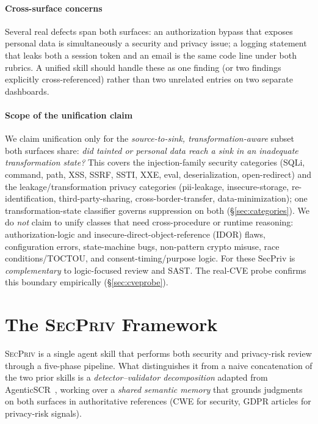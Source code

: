 \documentclass[runningheads]{llncs}
\begin{document}
\paragraph{Cross-surface concerns} Several real defects span both surfaces: an authorization bypass that exposes personal data is simultaneously a security and privacy issue; a logging statement that leaks both a session token and an email is the same code line under both rubrics. A unified skill should handle these as one finding (or two findings explicitly cross-referenced) rather than two unrelated entries on two separate dashboards.

\paragraph{Scope of the unification claim} We claim unification only for the \emph{source-to-sink, transformation-aware} subset both surfaces share: \emph{did tainted or personal data reach a sink in an inadequate transformation state?} This covers the injection-family security categories (SQLi, command, path, XSS, SSRF, SSTI, XXE, eval, deserialization, open-redirect) and the leakage/transformation privacy categories (pii-leakage, insecure-storage, re-identification, third-party-sharing, cross-border-transfer, data-minimization); one transformation-state classifier governs suppression on both (\S\ref{sec:categories}). We do \emph{not} claim to unify classes that need cross-procedure or runtime reasoning: authorization-logic and insecure-direct-object-reference (IDOR) flaws, configuration errors, state-machine bugs, non-pattern crypto misuse, race conditions/TOCTOU, and consent-timing/purpose logic. For these SecPriv is \emph{complementary} to logic-focused review and SAST. The real-CVE probe confirms this boundary empirically (\S\ref{sec:cveprobe}).

\section{The \textsc{SecPriv} Framework}\label{sec:framework}

\textsc{SecPriv} is a single agent skill that performs both security and privacy-risk review through a five-phase pipeline. What distinguishes it from a naive concatenation of the two prior skills is a \emph{detector--validator decomposition} adapted from AgenticSCR~\cite{charoenwet2026agenticscr}, working over a \emph{shared semantic memory} that grounds judgments on both surfaces in authoritative references (CWE for security, GDPR articles for privacy-risk signals).
\end{document}
